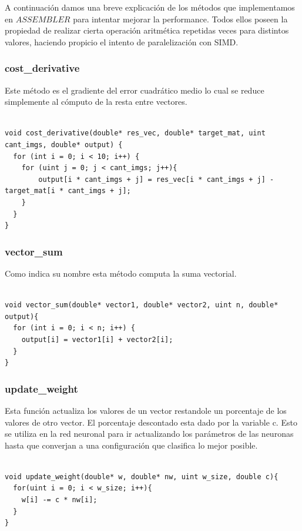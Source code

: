 A continuación damos una breve explicación de los métodos que implementamos en $ASSEMBLER$ para intentar mejorar la performance. Todos ellos poseen la propiedad de realizar cierta operación aritmética repetidas veces para distintos valores, haciendo propicio el intento de paralelización con SIMD.

\subsubsection{cost\_derivative}

Este método es el gradiente del error cuadrático medio lo cual se reduce simplemente al cómputo de la resta entre vectores.
\\
\\
\begin{lstlisting}
void cost_derivative(double* res_vec, double* target_mat, uint cant_imgs, double* output) {
  for (int i = 0; i < 10; i++) {
    for (uint j = 0; j < cant_imgs; j++){
        output[i * cant_imgs + j] = res_vec[i * cant_imgs + j] - target_mat[i * cant_imgs + j];
    }
  }
}
\end{lstlisting}

\subsubsection{vector\_sum}

Como indica su nombre esta método computa la suma vectorial.
\\
\\
\begin{lstlisting}[frame=single]
void vector_sum(double* vector1, double* vector2, uint n, double* output){
  for (int i = 0; i < n; i++) {
    output[i] = vector1[i] + vector2[i];
  }
}
\end{lstlisting}


\subsubsection{update\_weight}

Esta función actualiza los valores de un vector restandole un porcentaje de los valores de otro vector. El porcentaje descontado esta dado por la variable c. Esto se utiliza en la red neuronal para ir actualizando los parámetros de las neuronas hasta que converjan a una configuración que clasifica lo mejor posible.
\\
\\
\begin{lstlisting}[frame=single]
void update_weight(double* w, double* nw, uint w_size, double c){
  for(uint i = 0; i < w_size; i++){
    w[i] -= c * nw[i];
  }
}
\end{lstlisting}

